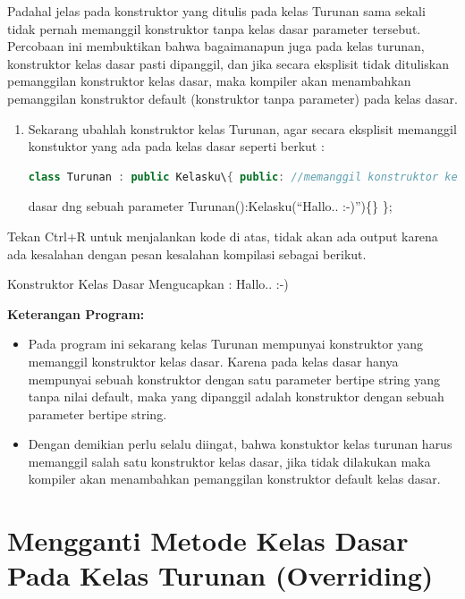Padahal jelas pada konstruktor yang ditulis pada kelas Turunan sama
sekali tidak pernah memanggil konstruktor tanpa kelas dasar parameter
tersebut. Percobaan ini membuktikan bahwa bagaimanapun juga pada kelas
turunan, konstruktor kelas dasar pasti dipanggil, dan jika secara
eksplisit tidak dituliskan pemanggilan konstruktor kelas dasar, maka
kompiler akan menambahkan pemanggilan konstruktor default (konstruktor
tanpa parameter) pada kelas dasar.

\begin{enumerate}
\def\labelenumi{\arabic{enumi}.}
\setcounter{enumi}{2}
\item
  Sekarang ubahlah konstruktor kelas Turunan, agar secara eksplisit
  memanggil konstuktor yang ada pada kelas dasar seperti berkut :
\begin{lstlisting}[language=c++, numbers=none]
class Turunan : public Kelasku\{ public: //memanggil konstruktor kelas
\end{lstlisting}
  
  dasar dng sebuah parameter Turunan():Kelasku(``Hallo.. :-)'')\{\} \};
\end{enumerate}

Tekan Ctrl+R untuk menjalankan kode di atas, tidak akan ada output
karena ada kesalahan dengan pesan kesalahan kompilasi sebagai berikut.

\begin{lcverbatim}
Konstruktor Kelas Dasar 
Mengucapkan : Hallo.. :-)
\end{lcverbatim}
 

\textbf{Keterangan Program:}

\begin{itemize}
\tightlist
\item
  Pada program ini sekarang kelas Turunan mempunyai konstruktor yang
  memanggil konstruktor kelas dasar. Karena pada kelas dasar hanya
  mempunyai sebuah konstruktor dengan satu parameter bertipe string yang
  tanpa nilai default, maka yang dipanggil adalah konstruktor dengan
  sebuah parameter bertipe string.
\item
  Dengan demikian perlu selalu diingat, bahwa konstuktor kelas turunan
  harus memanggil salah satu konstruktor kelas dasar, jika tidak
  dilakukan maka kompiler akan menambahkan pemanggilan konstruktor
  default kelas dasar.
\end{itemize}

\section{Mengganti Metode Kelas Dasar Pada Kelas Turunan
(Overriding)}\label{mengganti-metode-kelas-dasar-pada-kelas-turunan-overriding}

